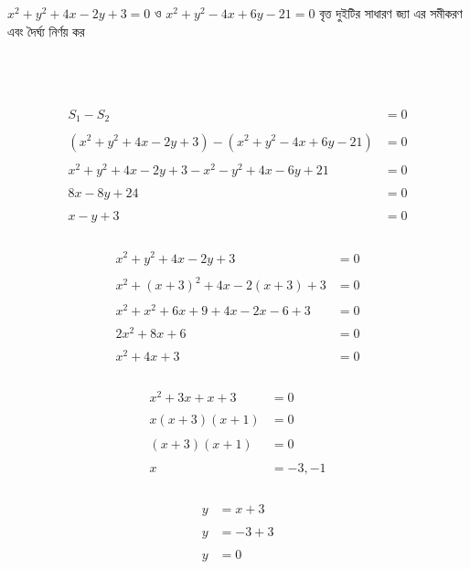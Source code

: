\documentclass{article}
\begin{document}
 
	\Large
$x^2+y^2+4x-2y+3=0$ ও $x^2+y^2-4x+6y-21=0$ বৃত্ত দুইটির সাধারণ জ্যা এর সমীকরণ এবং দৈর্ঘ্য নির্ণয় কর \\ 
\\  
\\
\\ 
\begin{align*}
	S_1-S_2&=0\\
	\\
	(x^2+y^2+4x-2y+3)-(x^2+y^2-4x+6y-21)&=0\\
	\\
	x^2+y^2+4x-2y+3-x^2-y^2+4x-6y+21&=0\\
	\\
	8x-8y+24&=0\\
	\\
	x-y+3&=0\\
\end{align*}
\\
\begin{align*}
	x^2+y^2+4x-2y+3&=0\\
	\\
	x^2+(x+3)^2+4x-2(x+3)+3&=0\\
	\\
	x^2+x^2+6x+9+4x-2x-6+3&=0\\
	\\
	2x^2+8x+6&=0\\
	\\
	x^2+4x+3&=0\\
\end{align*}
\\
\begin{align*}
	x^2+3x+x+3&=0\\
	\\
	x(x+3)(x+1)&=0\\
	\\
	(x+3)(x+1)&=0\\
	\\
	x&=-3,-1\\
\end{align*}
\\
\begin{align*}
	y&=x+3\\
	\\
	y&=-3+3\\
	\\
	y&=0\\
\end{align*}
\end{document}
